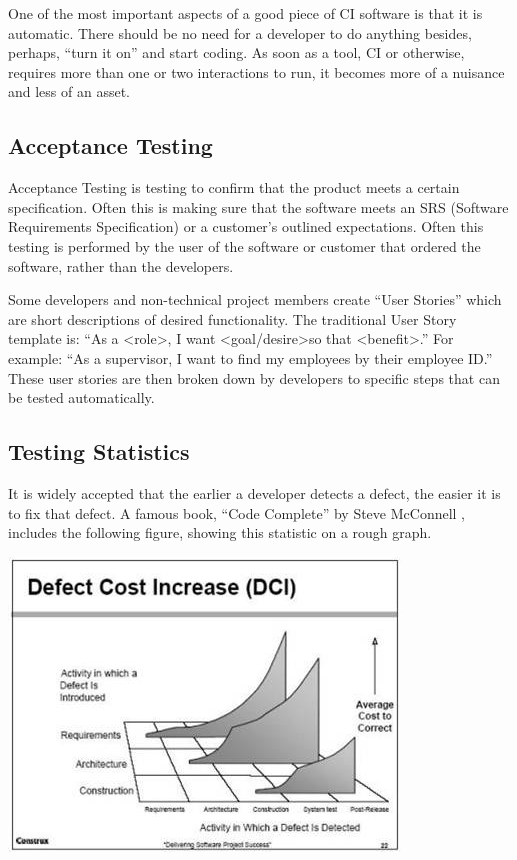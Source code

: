 \documentclass[12pt]{ucthesis}
\newenvironment{Figure}
  {\par\medskip\noindent\minipage{\linewidth}}
  {\endminipage\par\medskip}
\begin{document}
One of the most important aspects of a good piece of CI software is that it is automatic. There should be no need for a developer to do anything besides, perhaps, ``turn it on'' and start coding. As soon as a tool, CI or otherwise, requires more than one or two interactions to run, it becomes more of a nuisance and less of an asset.

\subsection{Acceptance Testing}
Acceptance Testing is testing to confirm that the product meets a certain specification. Often this is making sure that the software meets an SRS (Software Requirements Specification) or a customer's outlined expectations. Often this testing is performed by the user of the software or customer that ordered the software, rather than the developers.

Some developers and non-technical project members create ``User Stories'' which are short descriptions of desired functionality. The traditional User Story template is: ``As a \textless role\textgreater, I want \textless goal/desire\textgreater \space so that \textless benefit\textgreater.'' For example: ``As a supervisor, I want to find my employees by their employee ID.'' These user stories are then broken down by developers to specific steps that can be tested automatically.

\subsection{Testing Statistics}
It is widely accepted that the earlier a developer detects a defect, the easier it is to fix that defect. A famous book, ``Code Complete'' by Steve McConnell \cite{DefectPic}, includes the following figure, showing this statistic on a rough graph.

\begin{Figure}
  \centering
	\includegraphics[width=0.75\linewidth]{defectcost.jpg} 
\end{Figure}
\end{document}
